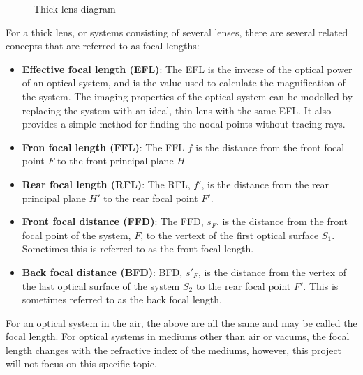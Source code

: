 \documentclass[10pt]{article}
\begin{document}
\begin{multicols}{2}
\begin{figure}[H]
    \caption{Thick lens diagram}
    \label{fig:lens-diagram}
\end{figure}
For a thick lens, or systems consisting of several lenses, there are several related concepts that are referred to as focal lengths:
\begin{itemize}
    \item \textbf{Effective focal length (EFL)}: The EFL is the inverse of the optical power of an optical system, and is the value used to calculate the magnification of the system. The imaging properties of the optical system can be modelled by replacing the system with an ideal, thin lens with the same EFL. It also provides a simple method for finding the nodal points without tracing rays.
    \item \textbf{Fron focal length (FFL)}: The FFL $f$ is the distance from the front focal point $F$ to the front principal plane $H$
    \item \textbf{Rear focal length (RFL)}: The RFL, $f'$, is the distance from the rear principal plane $H'$ to the rear focal point $F'$.
    \item \textbf{Front focal distance (FFD)}: The FFD, $s_F$, is the distance from the front focal point of the system, $F$, to the vertext of the first optical surface $S_1$. Sometimes this is referred to as the front focal length.
    \item \textbf{Back focal distance (BFD)}: BFD, $s'_F$, is the distance from the vertex of the last optical surface of the system $S_2$ to the rear focal point $F'$. This is sometimes referred to as the back focal length.
\end{itemize}
For an optical system in the air, the above are all the same and may be called the focal length.
\newline \newline
For optical systems in mediums other than air or vacums, the focal length changes with the refractive index of the mediums, however, this project will not focus on this specific topic.


\end{multicols}
\end{document}
